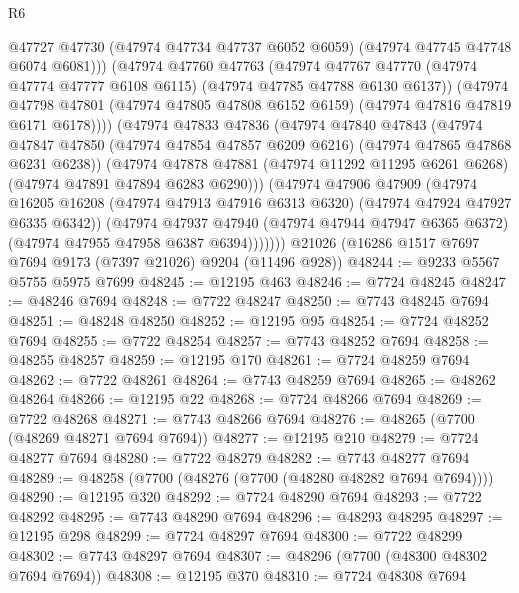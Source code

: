 \begin{lexlean}{R6}
\begin{coremodule}
                @47727
                @47730
                (@47974 @47734 @47737 @6052 @6059)
                (@47974 @47745 @47748 @6074 @6081)))
            (@47974
              @47760
              @47763
              (@47974
                @47767
                @47770
                (@47974 @47774 @47777 @6108 @6115)
                (@47974 @47785 @47788 @6130 @6137))
              (@47974
                @47798
                @47801
                (@47974 @47805 @47808 @6152 @6159)
                (@47974 @47816 @47819 @6171 @6178))))
          (@47974
            @47833
            @47836
            (@47974
              @47840
              @47843
              (@47974
                @47847
                @47850
                (@47974 @47854 @47857 @6209 @6216)
                (@47974 @47865 @47868 @6231 @6238))
              (@47974
                @47878
                @47881
                (@47974 @11292 @11295 @6261 @6268)
                (@47974 @47891 @47894 @6283 @6290)))
            (@47974
              @47906
              @47909
              (@47974
                @16205
                @16208
                (@47974 @47913 @47916 @6313 @6320)
                (@47974 @47924 @47927 @6335 @6342))
              (@47974
                @47937
                @47940
                (@47974 @47944 @47947 @6365 @6372)
                (@47974 @47955 @47958 @6387 @6394)))))))
    @21026
    (@16286 @1517 @7697 @7694 @9173 (@7397 @21026) @9204 (@11496 @928))
@48244 := @9233 @5567 @5755 @5975 @7699
@48245 := @12195 @463
@48246 := @7724 @48245
@48247 := @48246 @7694
@48248 := @7722 @48247
@48250 := @7743 @48245 @7694
@48251 := @48248 @48250
@48252 := @12195 @95
@48254 := @7724 @48252 @7694
@48255 := @7722 @48254
@48257 := @7743 @48252 @7694
@48258 := @48255 @48257
@48259 := @12195 @170
@48261 := @7724 @48259 @7694
@48262 := @7722 @48261
@48264 := @7743 @48259 @7694
@48265 := @48262 @48264
@48266 := @12195 @22
@48268 := @7724 @48266 @7694
@48269 := @7722 @48268
@48271 := @7743 @48266 @7694
@48276 := @48265 (@7700 (@48269 @48271 @7694 @7694))
@48277 := @12195 @210
@48279 := @7724 @48277 @7694
@48280 := @7722 @48279
@48282 := @7743 @48277 @7694
@48289 := @48258 (@7700 (@48276 (@7700 (@48280 @48282 @7694 @7694))))
@48290 := @12195 @320
@48292 := @7724 @48290 @7694
@48293 := @7722 @48292
@48295 := @7743 @48290 @7694
@48296 := @48293 @48295
@48297 := @12195 @298
@48299 := @7724 @48297 @7694
@48300 := @7722 @48299
@48302 := @7743 @48297 @7694
@48307 := @48296 (@7700 (@48300 @48302 @7694 @7694))
@48308 := @12195 @370
@48310 := @7724 @48308 @7694

\end{coremodule}
\end{lexlean}
